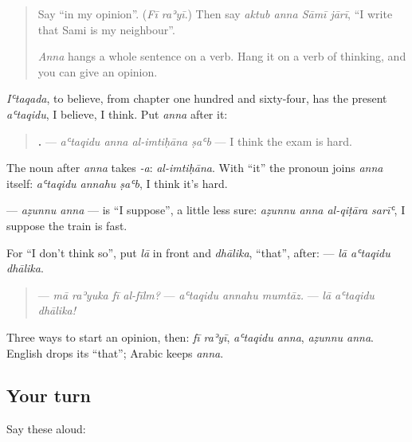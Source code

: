 \begin{quote}
Say \textquotedblleft{}in my opinion\textquotedblright{}. (\emph{Fī raʾyī}.) Then say \emph{aktub anna Sāmī jārī}, \textquotedblleft{}I write that Sami is my neighbour\textquotedblright{}.

\emph{Anna} hangs a whole sentence on a verb. Hang it on a verb of thinking, and you can give an opinion.
\end{quote}

\begin{grammarlens}[title={Grammar Lens: aʿtaqidu anna, aẓunnu anna}]
\emph{Iʿtaqada}, to believe, from chapter one hundred and sixty-four, has the present \emph{aʿtaqidu}, I believe, I think. Put \emph{anna} after it:

\begin{quote}
\textbf{   .} — \emph{aʿtaqidu anna al-imtiḥāna ṣaʿb} — I think the exam is hard.
\end{quote}

The noun after \emph{anna} takes \emph{-a}: \emph{al-imtiḥāna}. With \textquotedblleft{}it\textquotedblright{} the pronoun joins \emph{anna} itself: \emph{aʿtaqidu annahu ṣaʿb}, I think it's hard.

\textbf{ } — \emph{aẓunnu anna} — is \textquotedblleft{}I suppose\textquotedblright{}, a little less sure: \emph{aẓunnu anna al-qiṭāra sarīʿ}, I suppose the train is fast.
\end{grammarlens}

\begin{grammarlens}[title={Grammar Lens: agreeing and not}]
For \textquotedblleft{}I don't think so\textquotedblright{}, put \emph{lā} in front and \emph{dhālika}, \textquotedblleft{}that\textquotedblright{}, after: \textbf{  } — \emph{lā aʿtaqidu dhālika}.

\begin{quote}
— \emph{mā raʾyuka fī al-fīlm?} — \emph{aʿtaqidu annahu mumtāz.} — \emph{lā aʿtaqidu dhālika!}
\end{quote}

Three ways to start an opinion, then: \emph{fī raʾyī}, \emph{aʿtaqidu anna}, \emph{aẓunnu anna}. English drops its \textquotedblleft{}that\textquotedblright{}; Arabic keeps \emph{anna}.
\end{grammarlens}

\subsection*{Your turn}
Say these aloud:

